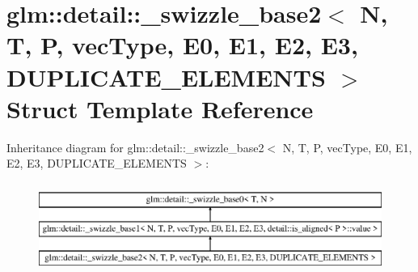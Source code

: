 \hypertarget{structglm_1_1detail_1_1__swizzle__base2}{}\section{glm\+:\+:detail\+:\+:\+\_\+swizzle\+\_\+base2$<$ N, T, P, vec\+Type, E0, E1, E2, E3, D\+U\+P\+L\+I\+C\+A\+T\+E\+\_\+\+E\+L\+E\+M\+E\+N\+TS $>$ Struct Template Reference}
\label{structglm_1_1detail_1_1__swizzle__base2}
Inheritance diagram for glm\+:\+:detail\+:\+:\+\_\+swizzle\+\_\+base2$<$ N, T, P, vec\+Type, E0, E1, E2, E3, D\+U\+P\+L\+I\+C\+A\+T\+E\+\_\+\+E\+L\+E\+M\+E\+N\+TS $>$\+:\begin{figure}[H]
\begin{center}
\leavevmode
\includegraphics[height=3.000000cm]{structglm_1_1detail_1_1__swizzle__base2}
\end{center}
\end{figure}
